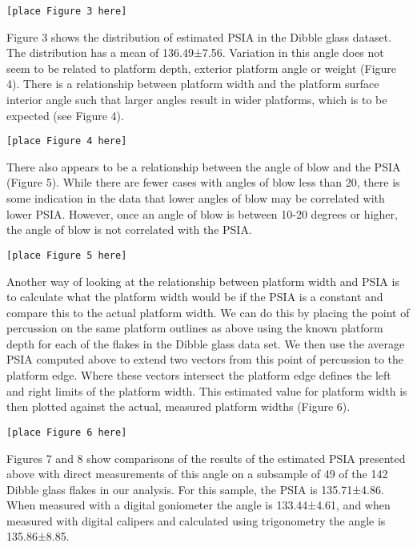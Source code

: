 \documentclass[10pt,letterpaper]{article}
\begin{document}
\begin{verbatim}
[place Figure 3 here]
\end{verbatim}

Figure 3 shows the distribution of estimated PSIA in the Dibble glass
dataset. The distribution has a mean of 136.49±7.56. Variation in this
angle does not seem to be related to platform depth, exterior platform
angle or weight (Figure 4). There is a relationship between platform
width and the platform surface interior angle such that larger angles
result in wider platforms, which is to be expected (see Figure 4).

\begin{verbatim}
[place Figure 4 here]
\end{verbatim}

There also appears to be a relationship between the angle of blow and
the PSIA (Figure 5). While there are fewer cases with angles of blow
less than 20, there is some indication in the data that lower angles of
blow may be correlated with lower PSIA. However, once an angle of blow
is between 10-20 degrees or higher, the angle of blow is not correlated
with the PSIA.

\begin{verbatim}
[place Figure 5 here]
\end{verbatim}

Another way of looking at the relationship between platform width and
PSIA is to calculate what the platform width would be if the PSIA is a
constant and compare this to the actual platform width. We can do this
by placing the point of percussion on the same platform outlines as
above using the known platform depth for each of the flakes in the
Dibble glass data set. We then use the average PSIA computed above to
extend two vectors from this point of percussion to the platform edge.
Where these vectors intersect the platform edge defines the left and
right limits of the platform width. This estimated value for platform
width is then plotted against the actual, measured platform widths
(Figure 6).

\begin{verbatim}
[place Figure 6 here]
\end{verbatim}

Figures 7 and 8 show comparisons of the results of the estimated PSIA
presented above with direct measurements of this angle on a subsample of
49 of the 142 Dibble glass flakes in our analysis. For this sample, the
PSIA is 135.71±4.86. When measured with a digital goniometer the angle
is 133.44±4.61, and when measured with digital calipers and calculated
using trigonometry the angle is 135.86±8.85.
\end{document}

